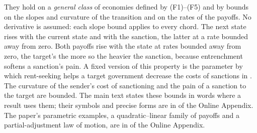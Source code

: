  They hold on a \emph{general class} of
economies defined by \textup{(F1)--(F5)} and by bounds on the slopes and
curvature of the transition and on the rates of the payoffs. No derivative is
assumed: each slope bound applies to every chord. The next state rises with the
current state and with the sanction, the latter at a rate bounded away from zero.
Both payoffs rise with the state at rates bounded away from zero, the target's
the more so the heavier the sanction, because entrenchment softens a sanction's
pain. A fixed version of this property is the parameter by which rent-seeking helps a
target government decrease the costs of sanctions in \citet[p.~407]{DorussenMo2001}. The curvature of the sender's cost of sanctioning and the pain of a
sanction to the target are bounded. The main text states these bounds in words
where a result uses them; their symbols and precise forms are in
 of the Online Appendix. The paper's
parametric examples, a quadratic--linear family of payoffs and a partial-adjustment
law of motion, are in  of the Online Appendix.

